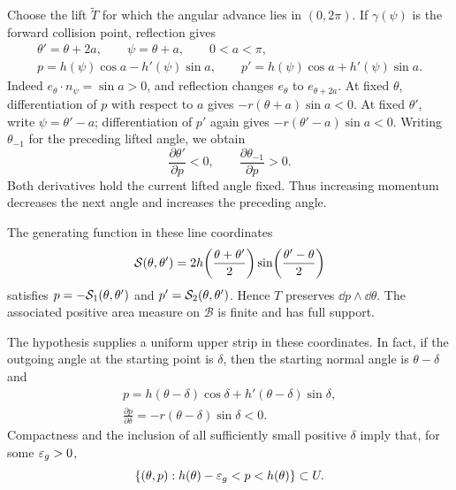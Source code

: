 Choose the lift $\widetilde T$ for which the angular advance lies in
$(0,2\pi)$.  If $\gamma(\psi)$ is the forward collision point, reflection
gives
\begin{equation}\label{geo:reflection}
 \begin{gathered}
 \theta'=\theta+2a,\qquad \psi=\theta+a,\qquad 0<a<\pi,\\
 p=h(\psi)\cos a-h'(\psi)\sin a,\qquad
 p'=h(\psi)\cos a+h'(\psi)\sin a.
 \end{gathered}
\end{equation}
Indeed $e_\theta\cdot n_\psi=\sin a>0$, and reflection changes
$e_\theta$ to $e_{\theta+2a}$.  At fixed $\theta$, differentiation of
$p$ with respect to $a$ gives $-r(\theta+a)\sin a<0$.
At fixed $\theta'$, write $\psi=\theta'-a$; differentiation of $p'$
again gives $-r(\theta'-a)\sin a<0$.  Writing $\theta_{-1}$ for the
preceding lifted angle, we obtain
\begin{equation}\label{geo:twists}
 \frac{\partial\theta'}{\partial p}<0,
 \qquad \frac{\partial\theta_{-1}}{\partial p}>0.
\end{equation}
Both derivatives hold the current lifted angle fixed.  Thus increasing
momentum decreases the next angle and increases the preceding angle.

The generating function in these line coordinates
\citep{BialyMironov2017}
\begin{equation}\label{geo:generating}
 \mathcal{S}(\theta,\theta')
 =2h\!\left(\frac{\theta+\theta'}2\right)
       \sin\!\left(\frac{\theta'-\theta}2\right)
\end{equation}
satisfies $p=-\mathcal{S}_1(\theta,\theta')$ and
$p'=\mathcal{S}_2(\theta,\theta')$.  Hence $T$ preserves $\dd p\wedge\dd\theta$.
The associated positive area measure on $\mathcal B$ is finite and has
full support.

The hypothesis supplies a uniform upper strip in these coordinates.
In fact, if the outgoing angle at the starting point is $\delta$, then
the starting normal angle is $\theta-\delta$ and
\begin{equation}\label{geo:starting-momentum}
 \begin{gathered}
 p=h(\theta-\delta)\cos\delta
                 +h'(\theta-\delta)\sin\delta,\\
 \frac{\partial p}{\partial\delta}
             =-r(\theta-\delta)\sin\delta<0.
 \end{gathered}
\end{equation}
Compactness and the inclusion of all sufficiently small positive
$\delta$ imply that, for some $\varepsilon_g>0$,
\begin{equation}\label{geo:uniform-collar}
 \{(\theta,p):h(\theta)-\varepsilon_g<p<h(\theta)\}\subset U.
\end{equation}


